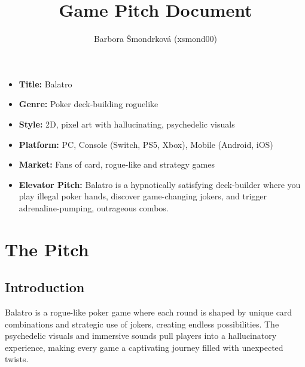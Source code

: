 \documentclass[a4paper,10pt,english]{article}
\title{%
Game Pitch Document%
}
\author{%
Barbora Šmondrková (xsmond00)%
}
\date{}
\begin{document}
\maketitle
\thispagestyle{empty}

{%
\large

\begin{itemize}

\item[] \textbf{Title:} Balatro

\item[] \textbf{Genre:} Poker deck-building roguelike

\item[] \textbf{Style:} 2D, pixel art with hallucinating, psychedelic visuals

\item[] \textbf{Platform:} PC, Console (Switch, PS5, Xbox), Mobile (Android, iOS)

\item[] \textbf{Market:} Fans of card, rogue-like and strategy games

\item[] \textbf{Elevator Pitch:} Balatro is a hypnotically satisfying deck-builder where you play illegal poker hands, discover game-changing jokers, and trigger adrenaline-pumping, outrageous combos.

\end{itemize}

}

\section*{\centering The Pitch}

\subsection*{Introduction}

Balatro is a rogue-like poker game where each round is shaped by unique card combinations and strategic use of jokers, creating endless possibilities. The psychedelic visuals and immersive sounds pull players into a hallucinatory experience, making every game a captivating journey filled with unexpected twists.
\end{document}
